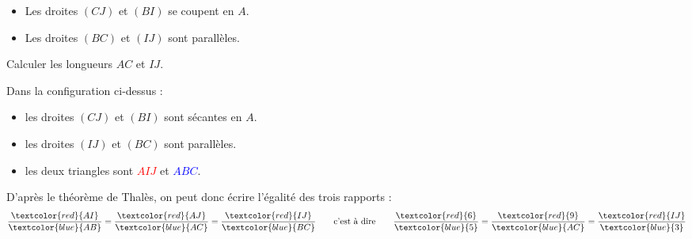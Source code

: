 \begin{methode*1}
\begin{minipage}{8cm}
            \end{minipage}
            \begin{minipage}{8cm}
                \begin{itemize}
                    \item Les droites $(CJ)$ et $(BI)$ se coupent en $A$.
                    \item Les droites $(BC)$ et $(IJ)$ sont parallèles.
                \end{itemize}
                Calculer les longueurs $AC$ et $IJ$.
            \end{minipage}
            
            \correction
            Dans la configuration ci-dessus : 
            \begin{itemize}
                \item les droites $(CJ)$ et $(BI)$ sont sécantes en $A$.
                \item les droites $(IJ)$ et $(BC)$ sont parallèles.
                \item les deux triangles sont \textcolor{red}{$AIJ$} et \textcolor{blue}{$ABC$}.
            \end{itemize}
            D'après le théorème de Thalès, on peut donc écrire l'égalité des trois rapports :
            $$\frac{\textcolor{red}{AI}}{\textcolor{blue}{AB}}=\frac{\textcolor{red}{AJ}}{\textcolor{blue}{AC}}=\frac{\textcolor{red}{IJ}}{\textcolor{blue}{BC}}\qquad\mbox{c'est à dire}\qquad\frac{\textcolor{red}{6}}{\textcolor{blue}{5}}=\frac{\textcolor{red}{9}}{\textcolor{blue}{AC}}=\frac{\textcolor{red}{IJ}}{\textcolor{blue}{3}}$$


\end{methode*1}
